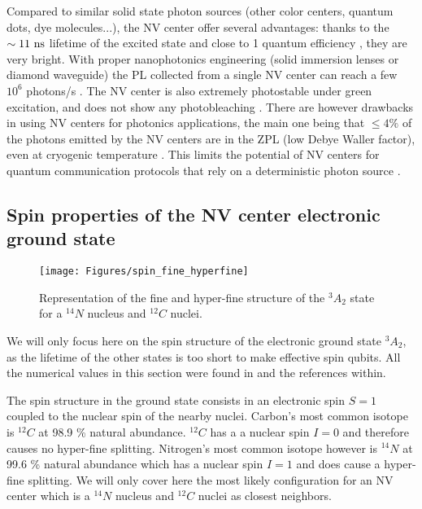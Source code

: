 \documentclass[a4paper,11pt]{report}
\begin{document}
\medskip
Compared to similar solid state photon sources (other color centers, quantum dots, dye molecules...), the NV center offer several advantages: thanks to the $\sim 11\ \rm ns$ lifetime of the excited state and close to 1 quantum efficiency \citep{kurtsiefer2000stable}, they are very bright. With proper nanophotonics engineering (solid immersion lenses or diamond waveguide) the PL collected from a single NV center can reach a few $10^6$ photons/s \citep{schroder2016quantum}. The NV center is also extremely photostable under green excitation, and does not show any photobleaching \citep{brouri2000photon}. There are however drawbacks in using NV centers for photonics applications, the main one being that $\leq 4\%$ of the photons emitted by the NV centers are in the ZPL (low Debye Waller factor), even at cryogenic temperature \citep{johnson2015tunable}. This limits the potential of NV centers for quantum communication protocols that rely on a deterministic photon source \citep{bradac2019quantum}.

\subsection{Spin properties of the NV center electronic ground state}
\begin{figure}[h!]
\centering
\texttt{[image: Figures/spin\_fine\_hyperfine]}
\caption{Representation of the fine and hyper-fine structure of the $^3A_2$ state for a $^{14}N$ nucleus and $^{12}C$ nuclei.}
\label{NV spin}
\end{figure}

We will only focus here on the spin structure of the electronic ground state $^3A_2$, as the lifetime of the other states is too short to make effective spin qubits. All the numerical values in this section were found in \citep{smeltzer2009robust, doherty2013nitrogen} and the references within.

The spin structure in the ground state consists in an electronic spin $S=1$ coupled to the nuclear spin of the nearby nuclei. Carbon's most common isotope is $^{12}C$ at 98.9 \% natural abundance. $^{12}C$ has a a nuclear spin $I=0$ and therefore causes no hyper-fine splitting. Nitrogen's most common isotope however is $^{14}N$ at 99.6 \% natural abundance which has a nuclear spin $I=1$ and does cause a hyper-fine splitting. We will only cover here the most likely configuration for an NV center which is a $^{14}N$ nucleus and $^{12}C$ nuclei as closest neighbors. 
\end{document}
